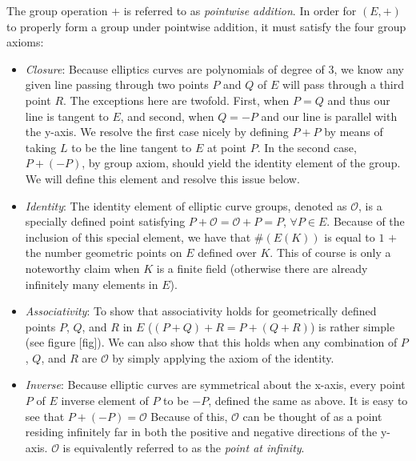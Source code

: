 The group operation $+$ is referred to as \emph{pointwise addition}. In order for $(E,+)$ to properly form a group under pointwise addition, it must satisfy the four group axioms:
\begin{itemize}
\item \emph{Closure}: Because elliptics curves are polynomials of degree of 3, we know any given line passing through two points $P$ and $Q$ of $E$ will pass through a third point $R$. The exceptions here are twofold. First, when $P = Q$ and thus our line is tangent to $E$, and second, when $Q = -P$ and our line is parallel with the y-axis. We resolve the first case nicely by defining $P + P$ by means of taking $L$ to be the line tangent to $E$ at point $P$. In the second case, $P + (-P)$, by group axiom, should yield the identity element of the group. We will define this element and resolve this issue below.  
\item \emph{Identity}: The identity element of elliptic curve groups, denoted as $\mathcal{O}$, is a specially defined point satisfying $P + \mathcal{O} = \mathcal{O} + P = P$, $\forall P \in E$. Because of the inclusion of this special element, we have that $\#(E(K))$ is equal to $1$ $+$ the number geometric points on $E$ defined over $K$. This of course is only a noteworthy claim when $K$ is a finite field (otherwise there are already infinitely many elements in $E$).
\item \emph{Associativity}: To show that associativity holds for geometrically defined points $P$, $Q$, and $R$ in $E$ ($(P + Q) + R = P + (Q + R)$) is rather simple (see figure [fig]). We can also show that this holds when any combination of $P$, $Q$, and $R$ are $\mathcal{O}$ by simply applying the axiom of the identity.
\item \emph{Inverse}: Because elliptic curves are symmetrical about the x-axis, every point $P$ of $E$ inverse element of $P$ to be $-P$, defined the same as above. It is easy to see that $P+(-P) = \mathcal{O}$ Because of this, $\mathcal{O}$ can be thought of as a point residing infinitely far in both the positive and negative directions of the y-axis. $\mathcal{O}$ is equivalently referred to as the \emph{point at infinity}.
\end{itemize}


